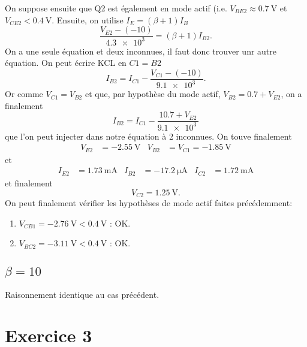 \documentclass[frenchb,DIV=13]{scrartcl}
\begin{document}
On suppose ensuite que Q2 est également en mode actif (i.e. $V_{BE2} \approx \SI{0.7}{\volt}$
et $V_{CE2} < \SI{0.4}{\volt}$. Ensuite, on utilise $I_E = (\beta+1)I_B$
\[ \frac{V_{E2}-(-10)}{\SI{4.3e3}{}} = (\beta+1)I_{B2}. \]
On a une seule équation et deux inconnues, il faut donc trouver unr autre équation. On
peut écrire KCL en $C1 = B2$
\[ I_{B2} = I_{C1} - \frac{V_{C1}-(-10)}{\SI{9.1e3}{}}. \]
Or comme $V_{C1} = V_{B2}$ et que, par hypothèse du mode actif, $V_{B2} = 0.7 + V_{E2}$,
on a finalement
\[ I_{B2} = I_{C1} - \frac{10.7 + V_{E2}}{\SI{9.1e3}{}}\]
que l'on peut injecter dans notre équation à 2 inconnues.
On touve finalement
\begin{align*}
	V_{E2} &= -\SI{2.55}{\volt} & V_{B2} &= V_{C1} = -\SI{1.85}{\volt}
\end{align*}
et
\begin{align*}
	I_{E2} &= \SI{1.73}{\milli\ampere} & I_{B2} &= -\SI{17.2}{\micro\ampere} & I_{C2} &=
	\SI{1.72}{\milli\ampere}
\end{align*}
et finalement
\[ V_{C2} = \SI{1.25}{\volt}. \]
On peut finalement vérifier les hypothèses de mode actif faites précédemment:
\begin{enumerate}
	\item $V_{CB1} = -\SI{2.76}{\volt} < \SI{0.4}{\volt}$ : OK.
	\item $V_{BC2} = -\SI{3.11}{\volt} < \SI{0.4}{\volt}$ : OK.
\end{enumerate}
 
\subsection*{$\beta = 10$}
Raisonnement identique au cas précédent.

\section*{Exercice 3}
\end{document}
